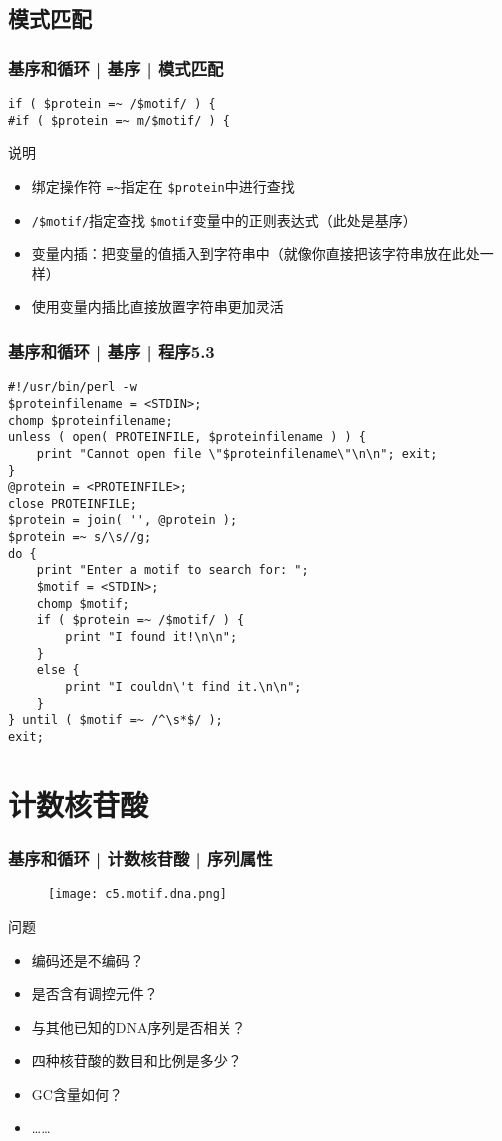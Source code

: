 \subsection{模式匹配}
\begin{frame}[fragile]
  \frametitle{基序和循环 | 基序 | \alert{模式匹配}}
\begin{lstlisting}
if ( $protein =~ /$motif/ ) {
#if ( $protein =~ m/$motif/ ) {
\end{lstlisting}
\pause
\begin{block}{说明}
  \begin{itemize}
    \item 绑定操作符 \verb|=~|指定在 \verb|$protein|中进行查找
    \item \verb|/$motif/|指定查找 \verb|$motif|变量中的正则表达式（此处是基序）
    \item 变量内插：把变量的值插入到字符串中（就像你直接把该字符串放在此处一样）
    \item 使用变量内插比直接放置字符串更加灵活
  \end{itemize}
\end{block}
\end{frame}

\begin{frame}[fragile]
  \frametitle{基序和循环 | 基序 | \alert{程序5.3}}
\begin{lstlisting}[basicstyle=\scriptsize\tt,numberstyle=\tiny]
#!/usr/bin/perl -w
$proteinfilename = <STDIN>;
chomp $proteinfilename;
unless ( open( PROTEINFILE, $proteinfilename ) ) {
    print "Cannot open file \"$proteinfilename\"\n\n"; exit;
}
@protein = <PROTEINFILE>;
close PROTEINFILE;
$protein = join( '', @protein );
$protein =~ s/\s//g;
do {
    print "Enter a motif to search for: ";
    $motif = <STDIN>;
    chomp $motif;
    if ( $protein =~ /$motif/ ) {
        print "I found it!\n\n";
    }
    else {
        print "I couldn\'t find it.\n\n";
    }
} until ( $motif =~ /^\s*$/ );
exit;
\end{lstlisting}
\end{frame}

\section{计数核苷酸}
\begin{frame}
  \frametitle{基序和循环 | 计数核苷酸 | 序列属性}
  \begin{figure}
    \centering
    \texttt{[image: c5.motif.dna.png]}
  \end{figure}
  \pause
  \begin{block}{问题}
    \begin{itemize}
      \item 编码还是不编码？
      \item 是否含有调控元件？
      \item 与其他已知的DNA序列是否相关？
      \item 四种核苷酸的数目和比例是多少？
      \item GC含量如何？
      \item ……
    \end{itemize}
  \end{block}
\end{frame}

